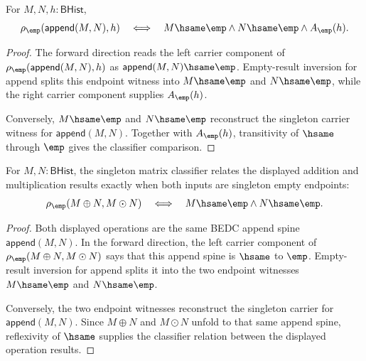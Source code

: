 \begin{theorem}
\label{thm:matrix-singleton-classifier-append-split-empty}
For $M,N,h:\mathsf{BHist}$,
$$
\rho_{\emp}(\mathsf{append}(M,N),h)
\quad\Longleftrightarrow\quad
M\hsame\emp\land N\hsame\emp\land A_{\emp}(h).
$$
\end{theorem}
\begin{proof}
The forward direction reads the left carrier component of
$\rho_{\emp}(\mathsf{append}(M,N),h)$ as
$\mathsf{append}(M,N)\hsame\emp$. Empty-result inversion for append splits this
endpoint witness into $M\hsame\emp$ and $N\hsame\emp$, while the right carrier
component supplies $A_{\emp}(h)$.

Conversely, $M\hsame\emp$ and $N\hsame\emp$ reconstruct the singleton carrier
witness for $\mathsf{append}(M,N)$. Together with $A_{\emp}(h)$, transitivity of
$\hsame$ through $\emp$ gives the classifier comparison.
\end{proof}

\begin{theorem}
\label{thm:matrix-singleton-add-mul-classifier-iff}
For $M,N:\mathsf{BHist}$, the singleton matrix classifier relates the displayed
addition and multiplication results exactly when both inputs are singleton
empty endpoints:
$$
\rho_{\emp}(M\oplus N,M\odot N)
\quad\Longleftrightarrow\quad
M\hsame\emp\land N\hsame\emp.
$$
\end{theorem}
\begin{proof}
Both displayed operations are the same BEDC append spine
$\mathsf{append}(M,N)$. In the forward direction, the left carrier component
of $\rho_{\emp}(M\oplus N,M\odot N)$ says that this append spine is
$\hsame$ to $\emp$. Empty-result inversion for append splits it into the two
endpoint witnesses $M\hsame\emp$ and $N\hsame\emp$.

Conversely, the two endpoint witnesses reconstruct the singleton carrier for
$\mathsf{append}(M,N)$. Since $M\oplus N$ and $M\odot N$ unfold to that same
append spine, reflexivity of $\hsame$ supplies the classifier relation between
the displayed operation results.
\end{proof}

